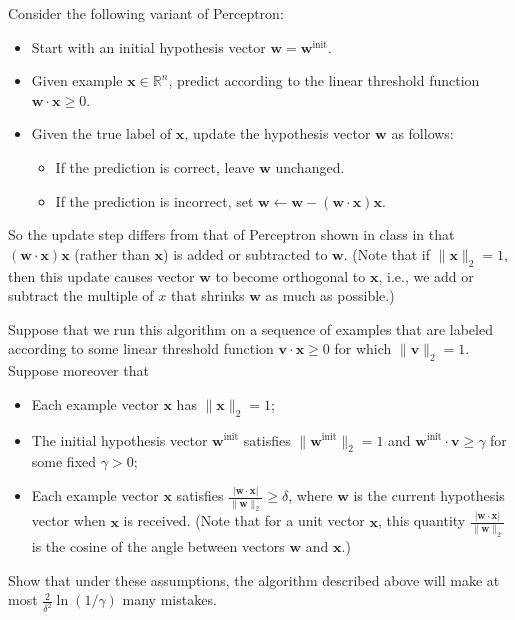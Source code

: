 \documentclass[a4paper]{article}
\theoremstyle{definition}
\renewcommand\vec[1]{\boldsymbol{#1}}
\begin{document}
\begin{enumerate}
Consider the following variant of Perceptron:

\begin{itemize}

\item Start with an initial hypothesis vector $\vec w = \vec w^{\text{init}}$.

\item Given example $\vec x \in \mathbb{R}^n$,
predict according to the linear threshold function $\vec w \cdot \vec x \geq 0$.

\item Given the true label of $\vec x$, update the hypothesis vector $\vec w$ as follows:

\begin{itemize}

\item If the prediction is correct, leave $\vec w$ unchanged.

\item If the prediction is incorrect, set $\vec w \leftarrow \vec w - (\vec w \cdot \vec x) \vec x$.

\end{itemize}

\end{itemize}

So the update step differs from that of Perceptron shown in class 
in that $(\vec w \cdot \vec x) \vec x$ (rather than $\vec x$) is added or subtracted to $\vec w$.
(Note that if $\|\vec x\|_2 = 1$, then this update causes vector $\vec w$ to become orthogonal to $\vec x$,
i.e., we add or subtract the multiple of $x$ that shrinks $\vec w$ as much as possible.)

Suppose that we run this algorithm on a sequence of examples that are labeled
according to some linear threshold function $\vec v \cdot \vec x \geq 0$
for which $\|\vec v\|_2 = 1$. Suppose moreover that

\begin{itemize}

\item Each example vector $\vec x$ has $\|\vec x\|_2 = 1$;

\item The initial hypothesis vector $\vec w^{\text{init}}$
satisfies $\|\vec w^{\text{init}}\|_2 = 1$ and
$\vec w^{\text{init}} \cdot \vec v \geq \gamma$
for some fixed $\gamma > 0$;

\item Each example vector $\vec x$ satisfies
$\frac{|\vec w \cdot \vec x|}{\|\vec w\|_2} \geq \delta$,
where $\vec w$ is the current hypothesis vector when $\vec x$ is received.
(Note that for a unit vector $\vec x$, this quantity $\frac{|\vec w \cdot \vec x|}{\|\vec w\|_2}$
is the cosine of the angle between vectors $\vec w$ and $\vec x$.)

\end{itemize}

Show that under these assumptions, the algorithm described above
will make at most $\frac{2}{\delta^2} \ln(1/\gamma)$ many mistakes.
\end{enumerate}
\end{document}
